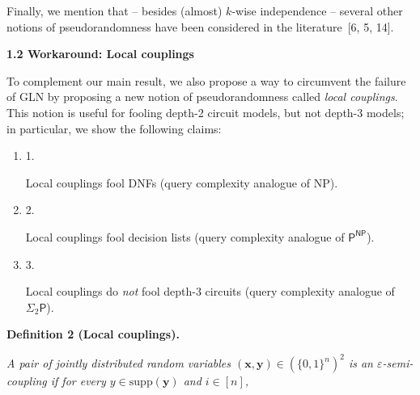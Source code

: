 \documentclass[10pt,a4paper]{article}
\begin{document}
Finally, we mention that – besides (almost) $k$-wise independence – several other notions of pseudorandomness have been considered in the literature [6, 5, 14].\par





\par\medskip\noindent\textbf{
1.2 Workaround: Local couplings}\par




To complement our main result, we also propose a way to circumvent the failure of GLN by proposing a new notion of pseudorandomness called \emph{local couplings}. This notion is useful for fooling depth-2 circuit models, but not depth-3 models; in particular, we show the following claims:\par


\begin{enumerate}


\item[] 
1. 


Local couplings fool DNFs (query complexity analogue of NP).\par





\item[] 
2. 


Local couplings fool decision lists (query complexity analogue of $\textsf{P}^{\textsf{NP}}$).\par





\item[] 
3. 


Local couplings do \emph{not} fool depth-3 circuits (query complexity analogue of $\Sigma_{2}\textsf{P}$).\par





\end{enumerate}





\par\medskip\noindent\textbf{
\textbf{Definition 2}\textbf{ }(Local couplings)\textbf{.}
}\par



\emph{A pair of jointly distributed random variables $(\bm{x},\bm{y})\in(\{0,1\}^{n})^{2}$ is an $\varepsilon$-semi-coupling if for every $y\in\mathrm{supp}(\bm{y})$ and $i\in[n]$,}\par
\end{document}
